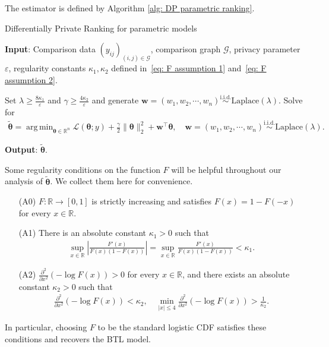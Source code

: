 \documentclass[letterpaper,12pt]{article}
\numberwithin{equation}{section}
\theoremstyle{plain}
\numberwithin{Theorem}{section}
\numberwithin{corollary}{section}
\numberwithin{proposition}{section}
\numberwithin{Lemma}{section}
{
	\theoremstyle{definition}
	\newtheorem{Definition}{Definition}
	\newtheorem{example}{Example}
	\numberwithin{example}{section}
	\newtheorem{fact}{Fact}
	\numberwithin{fact}{section}
	\newtheorem{remark}{Remark}
}
\newcommand{\1}{\mathbbm{1}}
\def\bth{{\boldsymbol{\theta}}}
\DeclareMathOperator*{\argmin}{arg\,min}
\def\R{{\mathbb R}}
\begin{document}
\vspace{-5.5mm}
The estimator is defined by Algorithm \ref{alg: DP parametric ranking}.
\begin{algorithm}[!htbp]
	\caption{Differentially Private Ranking for parametric models} 
	\label{alg: DP parametric ranking}
	\textbf{Input}: Comparison data $(y_{ij})_{(i,j)\in \mathcal{G}}$, comparison graph $\mathcal{G}$, privacy parameter $\varepsilon$, regularity constants $\kappa_1,\kappa_2$ defined in~\eqref{eq: F assumption 1} and~\eqref{eq: F assumption 2}.
	\begin{algorithmic}[1]
		\State Set $\lambda \geq \frac{8\kappa_1}{\varepsilon}$ and $\gamma \geq \frac{4\kappa_2}{\varepsilon}$ and generate 
		$
		\bm w = (w_1, w_2, \cdots, w_n) \stackrel{\text{i.i.d.}}{\sim }\text{Laplace}(\lambda).
		$
		\State Solve for
		\begin{align}\label{eq: ranking MLE definition}
			\widetilde \bth = \argmin_{\bth \in \R^n} \mathcal L(\bth; y) + \frac{\gamma}{2}\|\bth\|_2^2 + \bm w^\top \bth, \quad \bm w = (w_1, w_2, \cdots, w_n) \stackrel{\text{i.i.d.}}{\sim }\text{Laplace}(\lambda).
		\end{align}
	\end{algorithmic} 
	\textbf{Output}: $\widetilde \bth$.
\end{algorithm}

Some regularity conditions on the function $F$ will be helpful throughout our analysis of $\widetilde \bth$. We collect them here for convenience.
\begin{enumerate}
	\item[(A0)] $F: \R \to [0, 1]$ is strictly increasing and satisfies $F(x) = 1 - F(-x)$ for every $x \in \mathbb \R$.
	\item[(A1)] \label{itm: F assumption 1} There is an absolute constant $\kappa_1 > 0$ such that 
	\begin{align}\label{eq: F assumption 1}
		\sup_{x \in \R} \left|\frac{F'(x)}{F(x)(1 - F(x))}\right| = \sup_{x \in \R} \frac{F'(x)}{F(x)(1 - F(x))} < \kappa_1.
	\end{align}
	\item[(A2)]  \label{itm: F assumption 2} $\frac{\partial^2}{\partial x^2} \left(-\log F(x)\right) > 0$ for every $x \in \R$, and there exists an absolute constant $\kappa_2 > 0$ such that
	\begin{align}\label{eq: F assumption 2}
		\frac{\partial^2}{\partial x^2} \left(-\log F(x)\right) < \kappa_2, \quad \min_{|x| \leq 4} \frac{\partial^2}{\partial x^2} \left(-\log F(x)\right) > \frac{1}{\kappa_2}.
	\end{align}
\end{enumerate}
In particular, choosing $F$ to be the standard logistic CDF satisfies these conditions and recovers the BTL model. 
\end{document}
